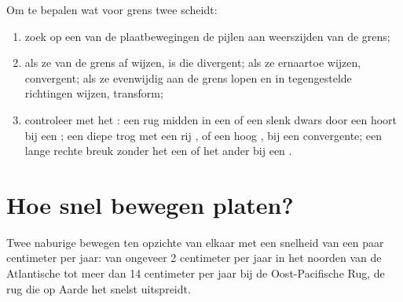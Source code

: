 \begin{method}\label{met:g7:plate-tectonics:recognise}
Om te bepalen wat voor grens twee  scheidt:
\begin{enumerate}
  \item zoek op een  van de plaatbewegingen de pijlen aan weerszijden
        van de grens;
  \item als ze van de grens af wijzen, is die divergent; als ze ernaartoe
        wijzen, convergent; als ze evenwijdig aan de grens lopen en in
        tegengestelde richtingen wijzen, transform;
  \item controleer met het : een rug midden in een  of een
        slenk dwars door een  hoort bij een ; een
        diepe trog met een rij , of een hoog , bij een
        convergente; een lange rechte breuk zonder het een of het ander bij
        een .
\end{enumerate}
\end{method}

\section{Hoe snel bewegen platen?}

\begin{proposition}\label{prop:g7:plate-tectonics:speed}
Twee naburige  bewegen ten opzichte van elkaar met een snelheid van
een paar centimeter per jaar: van ongeveer 2 centimeter per jaar in het
noorden van de Atlantische  tot meer dan 14 centimeter per jaar bij
de Oost-Pacifische Rug, de rug die op Aarde het snelst uitspreidt.
\end{proposition}

